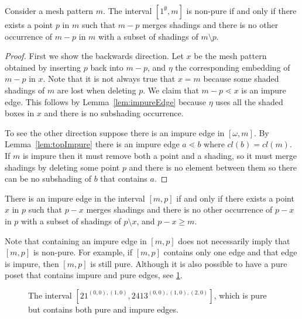 \documentclass[11pt,a4paper,oneside]{article}
\begin{document}
\begin{prop}
Consider a mesh pattern $m$. The interval $[1^\emptyset,m]$ is non-pure if and
only if there exists a point $p$ in $m$ such that $m-p$ merges shadings and
there is no other occurrence of $m-p$ in $m$ with a subset of shadings of
$m\setminus p$.
\begin{proof}
First we show the backwards direction. Let $x$  be the mesh pattern obtained by
inserting $p$ back into $m-p$, and $\eta$ the corresponding embedding of $m-p$
in $x$. Note that it is not always true that $x=m$ because some shaded shadings
of $m$ are lost when deleting $p$. We claim that $m-p\lessdot x$ is an impure
edge. This follows by Lemma~\ref{lem:impureEdge} because $\eta$ uses all the
shaded boxes in $x$ and there is no subshading occurrence.

To see the other direction suppose there is an impure edge in $[\omega,m]$. By
Lemma~\ref{lem:topImpure} there is an impure edge $a\lessdot b$ where
$cl(b)=cl(m)$. If $m$ is impure then it must remove both a point and a shading,
so it must merge shadings by deleting some point $p$ and there is no element
between them so there can be no subshading of $b$ that contains $a$.
\end{proof}
\end{prop}

\begin{cor}
There is an impure edge in the interval $[m,p]$ if and only if there exists a
point $x$ in $p$ such that $p-x$ merges shadings and there is no other
occurrence of $p-x$ in $p$ with a subset of shadings of $p\setminus x$, and
$p-x\ge m$.
\end{cor}

Note that containing an impure edge in $[m,p]$ does not necessarily imply
that $[m,p]$ is non-pure. For example, if $[m,p]$ contains only one edge and
that edge is impure, then $[m,p]$ is still pure. Although it is also possible
to have a pure poset that contains impure and pure edges, see \cref{fig:pureIm}.

\begin{figure}\centering
{}
\caption{The interval $[21^{(0,0),(1,0)},2413^{(0,0),(1,0),(2,0)}]$,
 which is pure but contains both pure and impure edges.}
 \label{fig:pureIm}
\end{figure}
\end{document}
